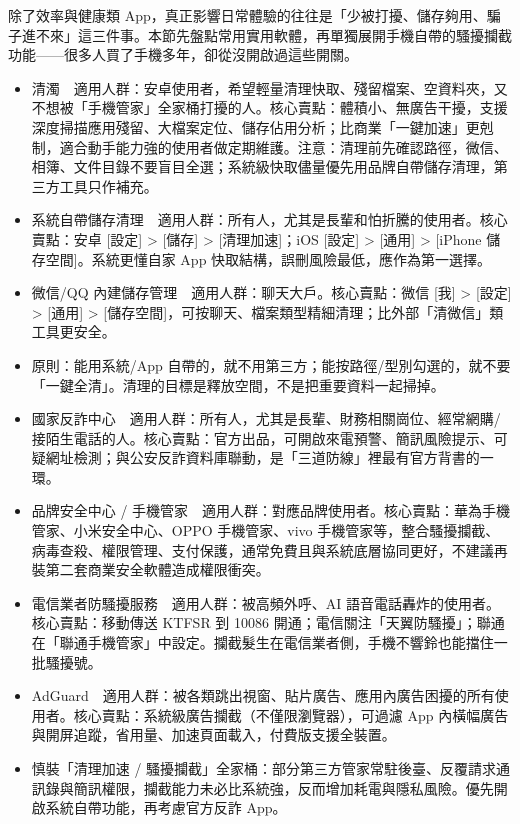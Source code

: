 
除了效率與健康類 App，真正影響日常體驗的往往是「少被打擾、儲存夠用、騙子進不來」這三件事。本節先盤點常用實用軟體，再單獨展開手機自帶的騷擾攔截功能——很多人買了手機多年，卻從沒開啟過這些開關。


\begin{itemize}
  \item 清濁　適用人群：安卓使用者，希望輕量清理快取、殘留檔案、空資料夾，又不想被「手機管家」全家桶打擾的人。核心賣點：體積小、無廣告干擾，支援深度掃描應用殘留、大檔案定位、儲存佔用分析；比商業「一鍵加速」更剋制，適合動手能力強的使用者做定期維護。注意：清理前先確認路徑，微信、相簿、文件目錄不要盲目全選；系統級快取儘量優先用品牌自帶儲存清理，第三方工具只作補充。
  \item 系統自帶儲存清理　適用人群：所有人，尤其是長輩和怕折騰的使用者。核心賣點：安卓 [設定] > [儲存] > [清理加速]；iOS [設定] > [通用] > [iPhone 儲存空間]。系統更懂自家 App 快取結構，誤刪風險最低，應作為第一選擇。
  \item 微信/QQ 內建儲存管理　適用人群：聊天大戶。核心賣點：微信 [我] > [設定] > [通用] > [儲存空間]，可按聊天、檔案類型精細清理；比外部「清微信」類工具更安全。
  \item 原則：能用系統/App 自帶的，就不用第三方；能按路徑/型別勾選的，就不要「一鍵全清」。清理的目標是釋放空間，不是把重要資料一起掃掉。
\end{itemize}


\begin{itemize}
  \item 國家反詐中心　適用人群：所有人，尤其是長輩、財務相關崗位、經常網購/接陌生電話的人。核心賣點：官方出品，可開啟來電預警、簡訊風險提示、可疑網址檢測；與公安反詐資料庫聯動，是「三道防線」裡最有官方背書的一環。
  \item 品牌安全中心 / 手機管家　適用人群：對應品牌使用者。核心賣點：華為手機管家、小米安全中心、OPPO 手機管家、vivo 手機管家等，整合騷擾攔截、病毒查殺、權限管理、支付保護，通常免費且與系統底層協同更好，不建議再裝第二套商業安全軟體造成權限衝突。
  \item 電信業者防騷擾服務　適用人群：被高頻外呼、AI 語音電話轟炸的使用者。核心賣點：移動傳送 KTFSR 到 10086 開通；電信關注「天翼防騷擾」；聯通在「聯通手機管家」中設定。攔截髮生在電信業者側，手機不響鈴也能擋住一批騷擾號。
  \item AdGuard　適用人群：被各類跳出視窗、貼片廣告、應用內廣告困擾的所有使用者。核心賣點：系統級廣告攔截（不僅限瀏覽器），可過濾 App 內橫幅廣告與開屏追蹤，省用量、加速頁面載入，付費版支援全裝置。
  \item 慎裝「清理加速 / 騷擾攔截」全家桶：部分第三方管家常駐後臺、反覆請求通訊錄與簡訊權限，攔截能力未必比系統強，反而增加耗電與隱私風險。優先開啟系統自帶功能，再考慮官方反詐 App。
\end{itemize}


